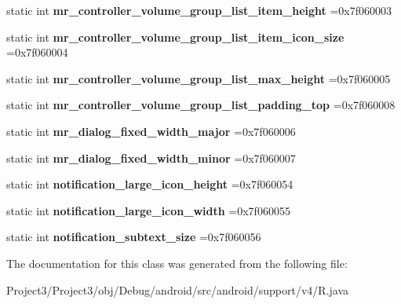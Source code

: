 \begin{DoxyCompactItemize}
\item 
\mbox{\label{classandroid_1_1support_1_1v4_1_1R_1_1dimen_ad6a808c1ef0b0eb25941a7e00209957f}} 
static int {\bfseries mr\+\_\+controller\+\_\+volume\+\_\+group\+\_\+list\+\_\+item\+\_\+height} =0x7f060003
\item 
\mbox{\label{classandroid_1_1support_1_1v4_1_1R_1_1dimen_a8610c6eada4d1a4e3559d8586f780771}} 
static int {\bfseries mr\+\_\+controller\+\_\+volume\+\_\+group\+\_\+list\+\_\+item\+\_\+icon\+\_\+size} =0x7f060004
\item 
\mbox{\label{classandroid_1_1support_1_1v4_1_1R_1_1dimen_a49525f29e6c2e4f36eb3e8b4bab058d1}} 
static int {\bfseries mr\+\_\+controller\+\_\+volume\+\_\+group\+\_\+list\+\_\+max\+\_\+height} =0x7f060005
\item 
\mbox{\label{classandroid_1_1support_1_1v4_1_1R_1_1dimen_ac50443c92fd05234ba2b7f6bc62f0af9}} 
static int {\bfseries mr\+\_\+controller\+\_\+volume\+\_\+group\+\_\+list\+\_\+padding\+\_\+top} =0x7f060008
\item 
\mbox{\label{classandroid_1_1support_1_1v4_1_1R_1_1dimen_a7f87c93f2e1c6111cfc4ad6c4c9bb018}} 
static int {\bfseries mr\+\_\+dialog\+\_\+fixed\+\_\+width\+\_\+major} =0x7f060006
\item 
\mbox{\label{classandroid_1_1support_1_1v4_1_1R_1_1dimen_ac6b1d7ac27dd259209a7f34ad6a49242}} 
static int {\bfseries mr\+\_\+dialog\+\_\+fixed\+\_\+width\+\_\+minor} =0x7f060007
\item 
\mbox{\label{classandroid_1_1support_1_1v4_1_1R_1_1dimen_a9b36f5a18494f4668dbdca04d40ae05e}} 
static int {\bfseries notification\+\_\+large\+\_\+icon\+\_\+height} =0x7f060054
\item 
\mbox{\label{classandroid_1_1support_1_1v4_1_1R_1_1dimen_a365e7d2d22c720a09aa97762063200fb}} 
static int {\bfseries notification\+\_\+large\+\_\+icon\+\_\+width} =0x7f060055
\item 
\mbox{\label{classandroid_1_1support_1_1v4_1_1R_1_1dimen_ac53e535eb8522a0c602b68b9ba267b20}} 
static int {\bfseries notification\+\_\+subtext\+\_\+size} =0x7f060056
\end{DoxyCompactItemize}


The documentation for this class was generated from the following file\+:\begin{DoxyCompactItemize}
\item 
Project3/\+Project3/obj/\+Debug/android/src/android/support/v4/R.\+java\end{DoxyCompactItemize}

